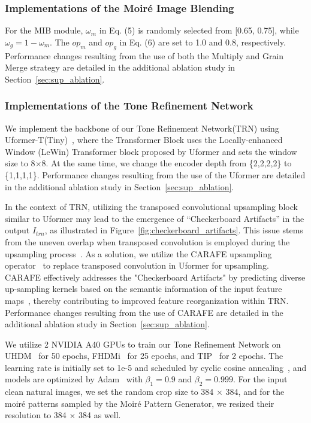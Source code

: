 \subsubsection{Implementations of the Moiré Image Blending} 
For the MIB module, $\omega_m$ in Eq. (5) is randomly selected from [0.65, 0.75], while $\omega_g = 1 - \omega_m$. The $op_m$ and $op_g$ in Eq. (6) are set to 1.0 and 0.8, respectively.
Performance changes resulting from the use of both the Multiply and Grain Merge strategy are detailed in the additional ablation study in Section~\ref{sec:sup_ablation}.

\subsubsection{Implementations of the Tone Refinement Network} 
We implement the backbone of our Tone Refinement Network(TRN) using Uformer-T(Tiny)~\cite{Wang2022Uformer}, where the Transformer Block uses the Locally-enhanced Window (LeWin) Transformer block proposed by Uformer and sets the window size to 8$\times$8. At the same time, we change the encoder depth from \{2,2,2,2\} to \{1,1,1,1\}. 
Performance changes resulting from the use of the Uformer are detailed in the additional ablation study in Section~\ref{sec:sup_ablation}.

In the context of TRN, utilizing the transposed convolutional upsampling block similar to Uformer may lead to the emergence of ``Checkerboard Artifacts'' in the output $I_{trn}$, as illustrated in Figure~\ref{fig:checkerboard_artifacts}.
This issue stems from the uneven overlap when transposed convolution is employed during the upsampling process~\cite{odena2016deconvolution}. 
As a solution, we utilize the CARAFE upsampling operator~\cite{wang2019carafe} to replace transposed convolution in Uformer for upsampling. 
CARAFE effectively addresses the "Checkerboard Artifacts" by predicting diverse up-sampling kernels based on the semantic information of the input feature maps~\cite{wang2019carafe}, thereby contributing to improved feature reorganization within TRN.
Performance changes resulting from the use of CARAFE are detailed in the additional ablation study in Section~\ref{sec:sup_ablation}.

We utilize 2 NVIDIA A40 GPUs to train our Tone Refinement Network on UHDM~\cite{yu2022towards} for 50 epochs, FHDMi~\cite{he2020fhde} for 25 epochs, and TIP~\cite{sun2018moire} for 2 epochs. 
The learning rate is initially set to 1e-5 and scheduled by cyclic cosine annealing~\cite{loshchilov2016sgdr}, and models are optimized by Adam~\cite{kingma2014adam} with $\beta_1=\text{0.9}$ and $\beta_2=\text{0.999}$. 
For the input clean natural images, we set the random crop size to 384 $\times$ 384, and for the moiré patterns sampled by the Moiré Pattern Generator, we resized their resolution to 384 $\times$ 384 as well. 


